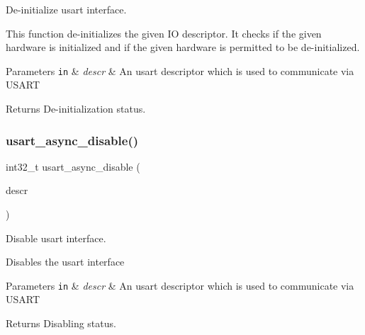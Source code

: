 De-\/initialize usart interface. 

This function de-\/initializes the given IO descriptor. It checks if the given hardware is initialized and if the given hardware is permitted to be de-\/initialized.


\begin{DoxyParams}[1]{Parameters}
\mbox{\tt in}  & {\em descr} & An usart descriptor which is used to communicate via U\+S\+A\+RT\\
\hline
\end{DoxyParams}
\begin{DoxyReturn}{Returns}
De-\/initialization status. 
\end{DoxyReturn}
\mbox{\label{group__doc__driver__hal__usart__async_ga575b7b546a7357088530a9cebf60ad9a}} 
\subsubsection{\texorpdfstring{usart\+\_\+async\+\_\+disable()}{usart\_async\_disable()}}
{\footnotesize\ttfamily int32\+\_\+t usart\+\_\+async\+\_\+disable (\begin{DoxyParamCaption}\item[{struct \hyperlink{structusart__async__descriptor}{usart\+\_\+async\+\_\+descriptor} $\ast$const}]{descr }\end{DoxyParamCaption})}



Disable usart interface. 

Disables the usart interface


\begin{DoxyParams}[1]{Parameters}
\mbox{\tt in}  & {\em descr} & An usart descriptor which is used to communicate via U\+S\+A\+RT\\
\hline
\end{DoxyParams}
\begin{DoxyReturn}{Returns}
Disabling status. 
\end{DoxyReturn}
\mbox{\label{group__doc__driver__hal__usart__async_gaa752e7d978b7f3bc35c97f9a7eb5f98a}} 
